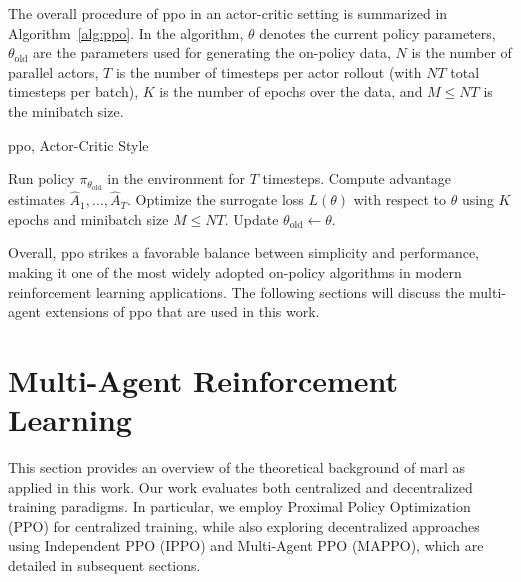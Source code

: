 The overall procedure of \gls{ppo} in an actor-critic setting is summarized in Algorithm~\ref{alg:ppo}. In the algorithm, \(\theta\) denotes the current policy parameters, \(\theta_{\text{old}}\) are the parameters used for generating the on-policy data, \(N\) is the number of parallel actors, \(T\) is the number of timesteps per actor rollout (with \(NT\) total timesteps per batch), \(K\) is the number of epochs over the data, and \(M \le NT\) is the minibatch size.


\begin{algorithm}[H]
\caption{\gls{ppo}, Actor-Critic Style}
\label{alg:ppo}
\begin{algorithmic}[1]
        \State Run policy \(\pi_{\theta_{\text{old}}}\) in the environment for \(T\) timesteps.
        \State Compute advantage estimates \(\hat{A}_1, \dots, \hat{A}_T\).
    \EndFor
    \State Optimize the surrogate loss \(L(\theta)\) with respect to \(\theta\) using \(K\) epochs and minibatch size \(M \le NT\).
    \State Update \(\theta_{\text{old}} \leftarrow \theta\).
\EndFor
\end{algorithmic}
\end{algorithm}

Overall, \gls{ppo} strikes a favorable balance between simplicity and performance, making it one of the most widely adopted on-policy algorithms in modern reinforcement learning applications. The following sections will discuss the multi-agent extensions of \gls{ppo} that are used in this work.
\section{Multi-Agent Reinforcement Learning}

This section provides an overview of the theoretical background of \gls{marl} as applied in this work. Our work evaluates both centralized and decentralized training paradigms. In particular, we employ Proximal Policy Optimization (PPO) for centralized training, while also exploring decentralized approaches using Independent PPO (IPPO) and Multi-Agent PPO (MAPPO), which are detailed in subsequent sections.


